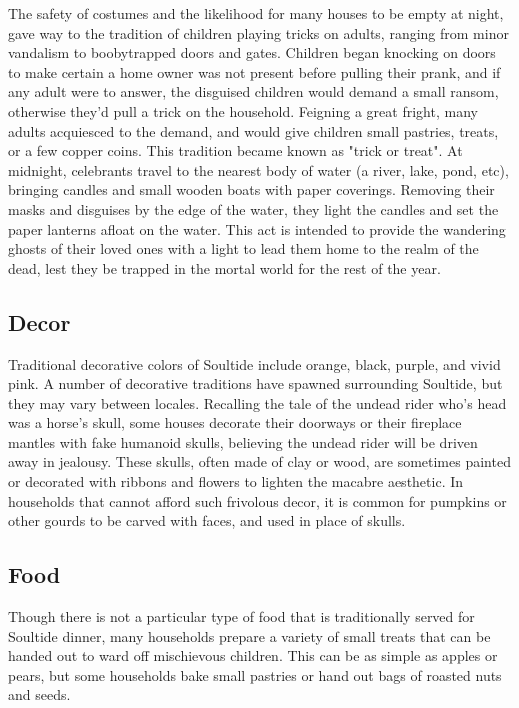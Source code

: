 \documentclass[10pt,a4paper,twoside,bg=print,twocolumn,openany,nodeprecatedcode]{dndbook}
\begin{document}
The safety of costumes and the likelihood for many houses to be empty at night, gave way to the tradition of children playing tricks on adults, ranging from minor vandalism to boobytrapped doors and gates. Children began knocking on doors to make certain a home owner was not present before pulling their prank, and if any adult were to answer, the disguised children would demand a small ransom, otherwise they'd pull a trick on the household. Feigning a great fright, many adults acquiesced to the demand, and would give children small pastries, treats, or a few copper coins. This tradition became known as "trick or treat".
At midnight, celebrants travel to the nearest body of water (a river, lake, pond, etc), bringing candles and small wooden boats with paper coverings. Removing their masks and disguises by the edge of the water, they light the candles and set the paper lanterns afloat on the water. This act is intended to provide the wandering ghosts of their loved ones with a light to lead them home to the realm of the dead, lest they be trapped in the mortal world for the rest of the year.
\subsection{Decor}
Traditional decorative colors of Soultide include orange, black, purple, and vivid pink. A number of decorative traditions have spawned surrounding Soultide, but they may vary between locales. Recalling the tale of the undead rider who's head was a horse's skull, some houses decorate their doorways or their fireplace mantles with fake humanoid skulls, believing the undead rider will be driven away in jealousy. These skulls, often made of clay or wood, are sometimes painted or decorated with ribbons and flowers to lighten the macabre aesthetic. In households that cannot afford such frivolous decor, it is common for pumpkins or other gourds to be carved with faces, and used in place of skulls.
\subsection{Food}
Though there is not a particular type of food that is traditionally served for Soultide dinner, many households prepare a variety of small treats that can be handed out to ward off mischievous children. This can be as simple as apples or pears, but some households bake small pastries or hand out bags of roasted nuts and seeds.
\end{document}
